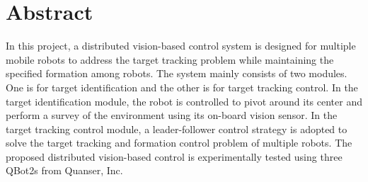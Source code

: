 \chapter*{Abstract} %

In this project, a distributed vision-based control system is designed for multiple mobile robots to address the target tracking problem while maintaining the specified formation among robots. The system mainly consists of two modules. One is for target identification and the other is for target tracking control. In the target identification module, the robot is controlled to pivot around its center and perform a survey of the environment using its on-board vision sensor. In the target tracking control module, a leader-follower control strategy is adopted to solve the target tracking and formation control problem of multiple robots. The proposed distributed vision-based control is experimentally tested using three QBot2s from Quanser, Inc. 